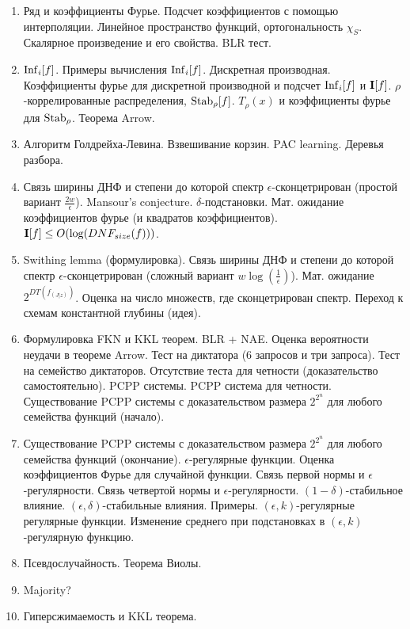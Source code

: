 \begin{enumerate}
    \item Ряд и коэффициенты Фурье. Подсчет коэффициентов с помощью интерполяции. Линейное пространство функций, ортогональность
        $\chi_S$. Скалярное произведение и его свойства. BLR тест.
    \item $\mathrm{Inf}_i[f]$. Примеры вычисления $\mathrm{Inf}_i[f]$. Дискретная производная. Коэффициенты фурье для дискретной производной и 
        подсчет $\mathrm{Inf}_i[f]$ и $\mathbf{I}[f]$. $\rho$-коррелированные распределения, $\mathrm{Stab}_{\rho}[f]$. $T_{\rho}(x)$ и коэффициенты фурье
        для $\mathrm{Stab}_{\rho}$. Теорема Arrow.
    \item Алгоритм Голдрейха-Левина. Взвешивание корзин. PAC learning. Деревья разбора.
    \item Связь ширины ДНФ и степени до которой спектр $\epsilon$-сконцетрирован (простой вариант
        $\frac{2w}{\epsilon}$). Mansour's conjecture. $\delta$-подстановки. Мат. ожидание коэффициентов фурье (и квадратов
        коэффициентов). $\mathbf{I}[f] \le O(\log(DNF_{size}(f)))$.
    \item Swithing lemma (формулировка). Связь ширины ДНФ и степени до которой спектр $\epsilon$-сконцетрирован (сложный вариант
        $w \log(\frac{1}{\epsilon})$). Мат. ожидание $2^{DT(f_{(J|z)})}$. Оценка на число множеств, где сконцетрирован
        спектр. Переход к схемам константной глубины (идея).
    \item Формулировка FKN и KKL теорем. BLR + NAE. Оценка вероятности неудачи в теореме Arrow. Тест на диктатора (6 запросов и
        три запроса). Тест на семейство диктаторов. Отсутствие теста для четности (доказательство самостоятельно). PCPP
        системы. PCPP система для четности. Существование PCPP системы с доказательством размера $2^{2^{n}}$ для любого семейства
        функций (начало).
    \item Существование PCPP системы с доказательством размера $2^{2^{n}}$ для любого семейства функций
        (окончание). $\epsilon$-регулярные функции. Оценка коэффициентов Фурье для случайной функции. Связь первой нормы и
        $\epsilon$-регулярности. Связь четвертой нормы и $\epsilon$-регулярности. $(1 - \delta)$-стабильное влияние. $(\epsilon,
        \delta)$-стабильные влияния. Примеры. $(\epsilon, k)$-регулярные регулярные функции. Изменение среднего при подстановках в
        $(\epsilon, k)$-регулярную функцию.
    \item Псевдослучайность. Теорема Виолы.
    \item Majority?
    \item Гиперсжимаемость и KKL теорема.
\end{enumerate}